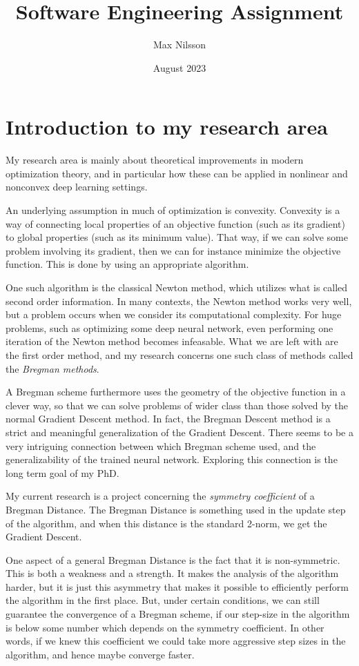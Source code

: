\documentclass[11pt]{article}
\title{Software Engineering Assignment}
\author{Max Nilsson}
\date{August 2023}
\begin{document}
\maketitle
\newpage

\section*{Introduction to my research area}

My research area is mainly about theoretical improvements in modern optimization theory, and in particular how these can be applied in nonlinear and nonconvex deep learning settings. 

An underlying assumption in much of optimization is convexity. Convexity is a way of connecting local properties of an objective function (such as its gradient) to global properties (such as its minimum value). That way, if we can solve some problem involving its gradient, then we can for instance minimize the objective function. This is done by using an appropriate algorithm. 

One such algorithm is the classical Newton method, which utilizes what is called second order information. In many contexts, the Newton method works very well, but a problem occurs when we consider its computational complexity. For huge problems, such as optimizing some deep neural network, even performing one iteration of the Newton method becomes infeasable. What we are left with are the first order method, and my research concerns one such class of methods called the \textit{Bregman methods}.

A Bregman scheme furthermore uses the geometry of the objective function in a clever way, so that we can solve problems of wider class than those solved by the normal Gradient Descent method. In fact, the Bregman Descent method is a strict and meaningful generalization of the Gradient Descent. There seems to be a very intriguing connection between which Bregman scheme used, and the generalizability of the trained neural network. Exploring this connection is the long term goal of my PhD. 

My current research is a project concerning the \textit{symmetry coefficient} of a Bregman Distance. The Bregman Distance is something used in the update step of the algorithm, and when this distance is the standard 2-norm, we get the Gradient Descent. 

One aspect of a general Bregman Distance is the fact that it is non-symmetric. This is both a weakness and a strength. It makes the analysis of the algorithm harder, but it is just this asymmetry that makes it possible to efficiently perform the algorithm in the first place. But, under certain conditions, we can still guarantee the convergence of a Bregman scheme, if our step-size in the algorithm is below some number which depends on the symmetry coefficient. In other words, if we knew this coefficient we could take more aggressive step sizes in the algorithm, and hence maybe converge faster. 
\end{document}

